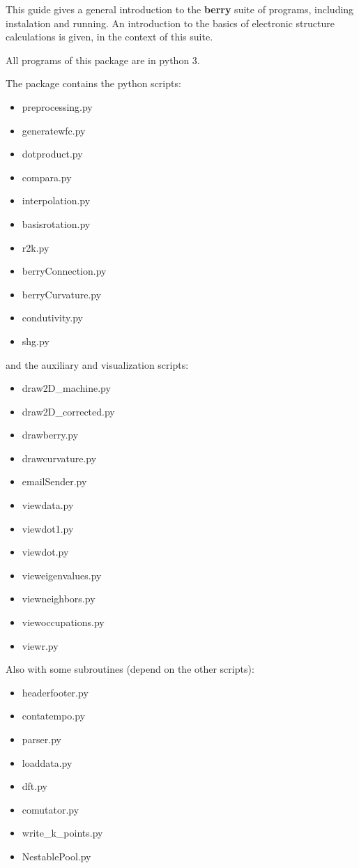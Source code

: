 \documentclass[a4paper,12pt]{report}
\begin{document}
 This guide gives a general introduction to the \textbf{berry} suite of programs, including instalation and running.
 An introduction to the basics of electronic structure calculations is given, in the context of this suite.

 All programs of this package are in python 3.

The package contains the python scripts:
\begin{itemize}
 \item preprocessing.py
 \item generatewfc.py
 \item dotproduct.py
 \item compara.py
 \item interpolation.py
 \item basisrotation.py
 \item r2k.py
 \item berryConnection.py
 \item berryCurvature.py
 \item condutivity.py
 \item shg.py
\end{itemize}\medskip

and the auxiliary and visualization scripts:
\begin{itemize}
 \item draw2D\_machine.py
 \item draw2D\_corrected.py
 \item drawberry.py
 \item drawcurvature.py
 \item emailSender.py
 \item viewdata.py
 \item viewdot1.py
 \item viewdot.py
 \item vieweigenvalues.py
 \item viewneighbors.py
 \item viewoccupations.py
 \item viewr.py
\end{itemize}\medskip

Also with some subroutines (depend on the other scripts):
\begin{itemize}
 \item headerfooter.py
 \item contatempo.py
 \item parser.py
 \item loaddata.py
 \item dft.py
 \item comutator.py
 \item write\_k\_points.py
 \item NestablePool.py
\end{itemize}
\end{document}
